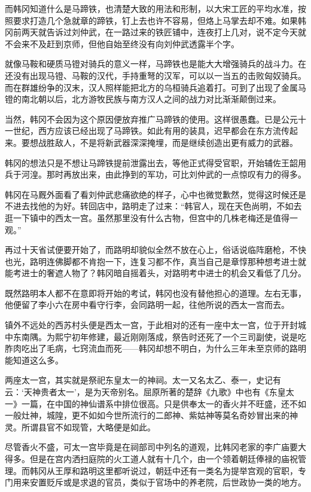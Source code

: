 而韩冈知道什么是马蹄铁，也清楚大致的用法和形制，以大宋工匠的平均水准，按照要求打造几个急就章的蹄铁，钉上去也许不容易，但烙上马掌去却不难。如果韩冈前两天就告诉过刘仲武，在一路过来的铁匠铺中，连夜打上几对，说不定今天就不会来不及赶到京师，但他自始至终没有向刘仲武透露半个字。

就像马鞍和硬质马镫对骑兵的意义一样，马蹄铁也是能大大增强骑兵的战斗力。在还没有出现马镫、马鞍的汉代，手持重弩的汉军，可以以一当五的击败匈奴骑兵。而在群雄纷争的汉末，汉人照样能把北方的乌桓骑兵追着打。可到了出现了金属马镫的南北朝以后，北方游牧民族与南方汉人之间的战力对比渐渐颠倒过来。

当然，韩冈不会因为这个原因便放弃推广马蹄铁的使用。这样很愚蠢。已是公元十一世纪，西方应该已经出现了马蹄铁。如此有用的装具，迟早都会在东方流传起来。要想战胜敌人，不是将新武器深深掩埋，而是继续创造出更有威力的武器。

韩冈的想法只是不想让马蹄铁提前泄露出去，等他正式得受官职，开始辅佐王韶用兵于河湟。那时再放出来，由此挣到的军功，可比刘仲武的一点惊叹有力的得多。

韩冈在马厩外面看了看刘仲武悲痛欲绝的样子，心中也微觉歉然，觉得这时候还是不进去找他的为好。转回店中，路明走了过来：“韩官人，现在天色尚明，不如去逛一下镇中的西太一宫。虽然那里没有什么古物，但宫中的几株老梅还是值得一观。”

再过十天省试便要开始了，而路明却貌似全然不放在心上，俗话说临阵磨枪，不快也光，路明连佛脚都不肯抱一下，连复习都不作，真当自己是章惇那种想考进士就能考进士的奢遮人物了？韩冈暗自摇着头，对路明考中进士的机会又看低了几分。

既然路明本人都不在意即将开始的考试，韩冈也没有替他担心的道理。左右无事，他便留了李小六在房中看守行李，会同路明一起，往他所说的西太一宫而去。

镇外不远处的西苏村头便是西太一宫，于此相对的还有一座中太一宫，位于开封城中东南隅。为熙宁初年修建，最近刚刚落成，祭告时还死了一个三司副使，说是吃胙肉吃出了毛病，七窍流血而死——韩冈却想不明白，为什么三年未至京师的路明能知道这么多。

两座太一宫，其实就是祭祀东皇太一的神祠。太一又名太乙、泰一，史记有云：‘天神贵者太一’，是为天帝别名。屈原所著的楚辞《九歌》中也有《东皇太一》一篇，在中国的神仙谱系中排位很高。只是供奉太一的香火并不旺盛，还不如一般灶神，城隍，更不如如今世所流行的二郎神、紫姑神等莫名奇妙冒出来的神灵。所谓县官不如现管，大略便是如此。

尽管香火不盛，可太一宫毕竟是在祠部司中列名的道观，比韩冈老家的李广庙要大得多。但是在宫内洒扫庭院的火工道人就有十几个，由一个领着朝廷俸禄的庙祝管理。而韩冈从王厚和路明这里都听说过，朝廷中还有一类名为提举宫观的官职，专门用来安置贬斥或是求退的官员，类似于官场中的养老院，后世政协一类的地方。

